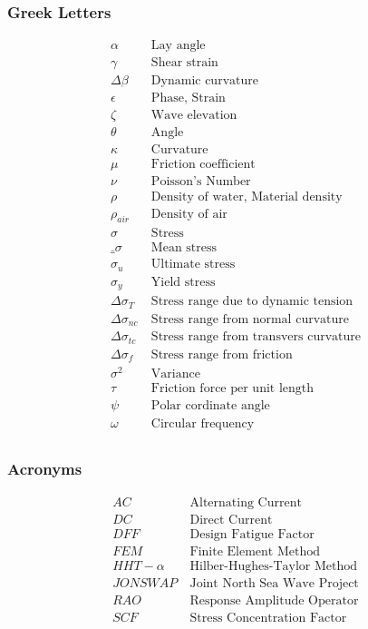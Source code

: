 \subsubsection*{Greek Letters}
\begin{align*}
\alpha &\ \text{Lay angle}\\
\gamma &\ \text{Shear strain}\\
\Delta \beta &\ \text{Dynamic curvature}\\
\epsilon &\ \text{Phase, Strain}\\
\zeta &\ \text{Wave elevation}\\
\theta &\ \text{Angle}\\
\kappa &\ \text{Curvature}\\
\mu &\ \text{Friction coefficient}\\
\nu &\ \text{Poisson's Number}\\
\rho &\ \text{Density of water, Material density}\\
\rho_{air} &\ \text{Density of air}\\
\sigma &\ \text{Stress}\\
\bar_{\sigma} &\ \text{Mean stress}\\
\sigma_u &\ \text{Ultimate stress}\\
\sigma_y &\ \text{Yield stress}\\
\Delta \sigma_T &\ \text{Stress range due to dynamic tension}\\
\Delta \sigma_{nc} &\ \text{Stress range from normal curvature}\\
\Delta \sigma_{tc} &\ \text{Stress range from transvers curvature}\\
\Delta \sigma_{f} &\ \text{Stress range from friction}\\
\sigma^2 &\ \text{Variance}\\
\tau &\ \text{Friction force per unit length}\\
\psi &\ \text{Polar cordinate angle}\\
\omega &\ \text{Circular frequency}\\
\end{align*}

\subsubsection*{Acronyms}
\begin{align*}
AC &\ \text{Alternating Current}\\
DC &\ \text{Direct Current}\\
DFF &\ \text{Design Fatigue Factor}\\
FEM &\ \text{Finite Element Method}\\
HHT-\alpha &\ \text{Hilber-Hughes-Taylor Method}\\
JONSWAP &\ \text{Joint North Sea Wave Project}\\
RAO &\ \text{Response Amplitude Operator}\\
SCF &\ \text{Stress Concentration Factor}\\
\end{align*}
